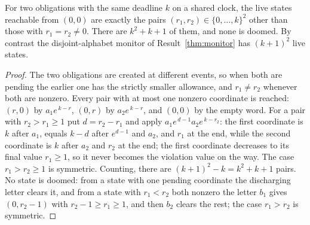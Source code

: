 \begin{newresult}\label{prop:shared-equal}
For two obligations with the same deadline $k$ on a shared clock, the live states reachable from $(0,0)$ are exactly the pairs $(r_1,r_2)\in\{0,\dots,k\}^{2}$ other than those with $r_1=r_2\ne0$. There are $k^{2}+k+1$ of them, and none is doomed. By contrast the disjoint-alphabet monitor of Result~\ref{thm:monitor} has $(k+1)^{2}$ live states.
\end{newresult}
\begin{proof}
The two obligations are created at different events, so when both are pending the earlier one has the strictly smaller allowance, and $r_1\ne r_2$ whenever both are nonzero. Every pair with at most one nonzero coordinate is reached: $(r,0)$ by $a_1e^{\,k-r}$, $(0,r)$ by $a_2e^{\,k-r}$, and $(0,0)$ by the empty word. For a pair with $r_2>r_1\ge1$ put $d=r_2-r_1$ and apply $a_1e^{\,d-1}a_2e^{\,k-r_2}$: the first coordinate is $k$ after $a_1$, equals $k-d$ after $e^{d-1}$ and $a_2$, and $r_1$ at the end, while the second coordinate is $k$ after $a_2$ and $r_2$ at the end; the first coordinate decreases to its final value $r_1\ge1$, so it never becomes the violation value on the way. The case $r_1>r_2\ge1$ is symmetric. Counting, there are $(k+1)^{2}-k=k^{2}+k+1$ pairs. No state is doomed: from a state with one pending coordinate the discharging letter clears it, and from a state with $r_1<r_2$ both nonzero the letter $b_1$ gives $(0,r_2-1)$ with $r_2-1\ge r_1\ge1$, and then $b_2$ clears the rest; the case $r_1>r_2$ is symmetric.
\end{proof}

